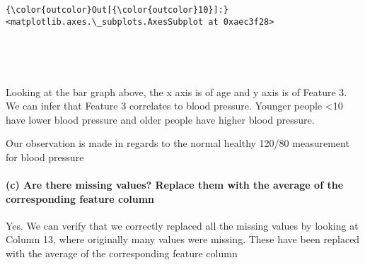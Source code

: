 \documentclass{article}
\begin{document}
            \begin{Verbatim}[commandchars=\\\{\}]
{\color{outcolor}Out[{\color{outcolor}10}]:} <matplotlib.axes.\_subplots.AxesSubplot at 0xaec3f28>
\end{Verbatim}
        
    \begin{center}
    \end{center}
    { \hspace*{\fill} \\}
    
    \begin{center}
    \end{center}
    { \hspace*{\fill} \\}
    
    Looking at the bar graph above, the x axis is of age and y axis is of
Feature 3. We can infer that Feature 3 correlates to blood pressure.
Younger people \textless{}10 have lower blood pressure and older people
have higher blood pressure.

Our observation is made in regards to the normal healthy 120/80
measurement for blood pressure

    \paragraph{(c) Are there missing values? Replace them with the average
of the corresponding feature
column}\label{c-are-there-missing-values-replace-them-with-the-average-of-the-corresponding-feature-column}

Yes. We can verify that we correctly replaced all the missing values by
looking at Column 13, where originally many values were missing. These
have been replaced with the average of the corresponding feature column
\end{document}
